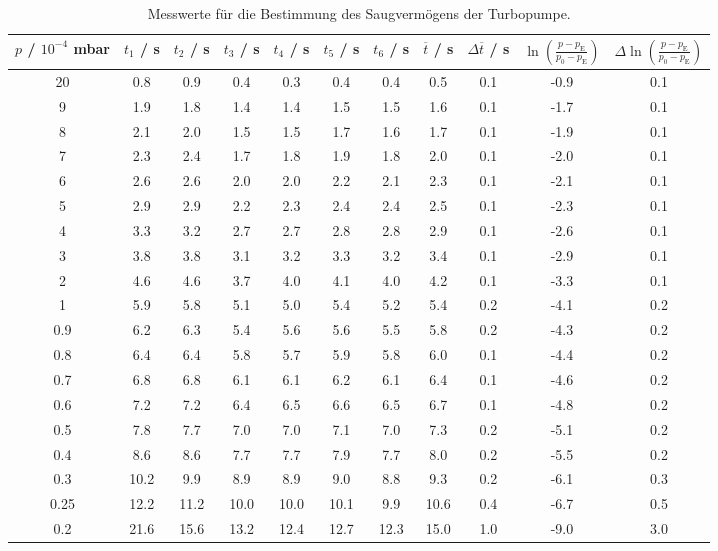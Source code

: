 \begin{table}[H] %
  \caption{Messwerte für die Bestimmung des Saugvermögens der Turbopumpe.}
  \label{tab:ptturbo}
  \hspace{-2cm}
  \begin{tabular}{c|c|c|c|c|c|c|c|c|c|c}
    $p$ / $10^{-4}$ mbar & $t_1$ / s & $t_2$ / s & $t_3$ / s & $t_4$ / s & $t_5$ / s & $t_6$ / s & $\overline{t}$ / s & $\Delta \overline{t}$ / s & $\ln\left( \frac{p-p_\text{E}}{p_0-p_\text{E}} \right)$ & $\Delta \ln\left( \frac{p-p_\text{E}}{p_0-p_\text{E}} \right)$ \\
    \midrule
    20   & 0.8  & 0.9  & 0.4  & 0.3  & 0.4  & 0.4  & 0.5  & 0.1 & -0.9 & 0.1 \\
    9    & 1.9  & 1.8  & 1.4  & 1.4  & 1.5  & 1.5  & 1.6  & 0.1 & -1.7 & 0.1 \\
    8    & 2.1  & 2.0  & 1.5  & 1.5  & 1.7  & 1.6  & 1.7  & 0.1 & -1.9 & 0.1 \\
    7    & 2.3  & 2.4  & 1.7  & 1.8  & 1.9  & 1.8  & 2.0  & 0.1 & -2.0 & 0.1 \\
    6    & 2.6  & 2.6  & 2.0  & 2.0  & 2.2  & 2.1  & 2.3  & 0.1 & -2.1 & 0.1 \\
    5    & 2.9  & 2.9  & 2.2  & 2.3  & 2.4  & 2.4  & 2.5  & 0.1 & -2.3 & 0.1 \\
    4    & 3.3  & 3.2  & 2.7  & 2.7  & 2.8  & 2.8  & 2.9  & 0.1 & -2.6 & 0.1 \\
    3    & 3.8  & 3.8  & 3.1  & 3.2  & 3.3  & 3.2  & 3.4  & 0.1 & -2.9 & 0.1 \\
    2    & 4.6  & 4.6  & 3.7  & 4.0  & 4.1  & 4.0  & 4.2  & 0.1 & -3.3 & 0.1 \\
    \hline
    1    & 5.9  & 5.8  & 5.1  & 5.0  & 5.4  & 5.2  & 5.4  & 0.2 & -4.1 & 0.2 \\
    0.9  & 6.2  & 6.3  & 5.4  & 5.6  & 5.6  & 5.5  & 5.8  & 0.2 & -4.3 & 0.2 \\
    0.8  & 6.4  & 6.4  & 5.8  & 5.7  & 5.9  & 5.8  & 6.0  & 0.1 & -4.4 & 0.2 \\
    0.7  & 6.8  & 6.8  & 6.1  & 6.1  & 6.2  & 6.1  & 6.4  & 0.1 & -4.6 & 0.2 \\
    0.6  & 7.2  & 7.2  & 6.4  & 6.5  & 6.6  & 6.5  & 6.7  & 0.1 & -4.8 & 0.2 \\
    0.5  & 7.8  & 7.7  & 7.0  & 7.0  & 7.1  & 7.0  & 7.3  & 0.2 & -5.1 & 0.2 \\
    0.4  & 8.6  & 8.6  & 7.7  & 7.7  & 7.9  & 7.7  & 8.0  & 0.2 & -5.5 & 0.2 \\
    \hline
    0.3  & 10.2 & 9.9  & 8.9  & 8.9  & 9.0  & 8.8  & 9.3  & 0.2 & -6.1 & 0.3 \\
    0.25 & 12.2 & 11.2 & 10.0 & 10.0 & 10.1 & 9.9  & 10.6 & 0.4 & -6.7 & 0.5 \\
    0.2  & 21.6 & 15.6 & 13.2 & 12.4 & 12.7 & 12.3 & 15.0 & 1.0 & -9.0 & 3.0 \\
  \end{tabular}
\end{table}


